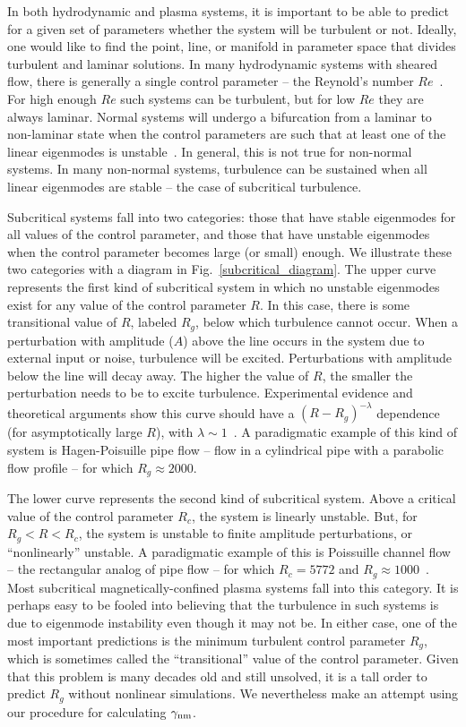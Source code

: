 \documentclass[twocolumn,showkeys,superscriptaddress]{revtex4}
\begin{document}
In both hydrodynamic and plasma systems, it is important to be able to predict for a given set of parameters whether the system will be turbulent or not.
Ideally, one would like to find the point, line, or manifold in parameter space that divides turbulent and laminar solutions.
In many hydrodynamic systems with sheared flow, there is generally a single control parameter -- the Reynold's number $Re$~\cite{drazin1981}. For high enough $Re$ such systems
can be turbulent, but for low $Re$ they are always laminar.
Normal systems will undergo a bifurcation from a laminar to non-laminar state when the control parameters are such that at least one of the linear eigenmodes is unstable~\cite{grossmann2000}.
In general, this is not true for non-normal systems. In many non-normal systems, turbulence can be sustained when all linear eigenmodes are stable -- the case of subcritical turbulence. 

Subcritical systems fall into two categories: those that have stable eigenmodes for all values of the control parameter, and those that have unstable eigenmodes
when the control parameter becomes large (or small) enough. We illustrate these two categories with a diagram in Fig.~\ref{subcritical_diagram}. 
The upper curve represents the first kind of subcritical system in which no unstable eigenmodes exist for any value of the control parameter $R$. In this
case, there is some transitional value of $R$, labeled $R_g$, below
which turbulence cannot occur. When a perturbation with amplitude
($A$) above the line occurs in the system due to external input or noise, 
turbulence will be excited. Perturbations with amplitude below the line will decay away. The higher the value of $R$, the smaller the perturbation needs to be to excite turbulence.
Experimental evidence and theoretical arguments show this curve should have a $(R-R_g)^{-\lambda}$ dependence (for asymptotically large $R$), with $\lambda \sim 1$~\cite{waleffe1995b,grossmann2000,hof2003}.
A paradigmatic example of this kind of system is Hagen-Poisuille pipe flow -- flow in a cylindrical pipe with a parabolic flow profile -- for which $R_g \approx 2000$.

The lower curve represents the second kind of subcritical system. Above a critical value of the control parameter $R_c$, the system is linearly unstable. But, for $R_g < R < R_c$, the system is
unstable to finite amplitude perturbations, or ``nonlinearly'' unstable. A paradigmatic example of this is Poissuille channel flow -- the rectangular analog of pipe flow -- for which
$R_c = 5772$ and $R_g \approx 1000$~\cite{grossmann2000}. Most subcritical magnetically-confined plasma systems fall into this category. It is perhaps easy to be fooled into believing that the turbulence
in such systems is due to eigenmode instability even though it may not be. 
In either case, one of the most important predictions is the minimum turbulent control parameter $R_g$, which is sometimes called the ``transitional'' value of the control parameter. Given that this problem is many decades old
and still unsolved, it is a tall order to predict $R_g$ without nonlinear simulations. We nevertheless make an attempt using our procedure for calculating $\gamma_{\rm{nm}}$.
\end{document}
